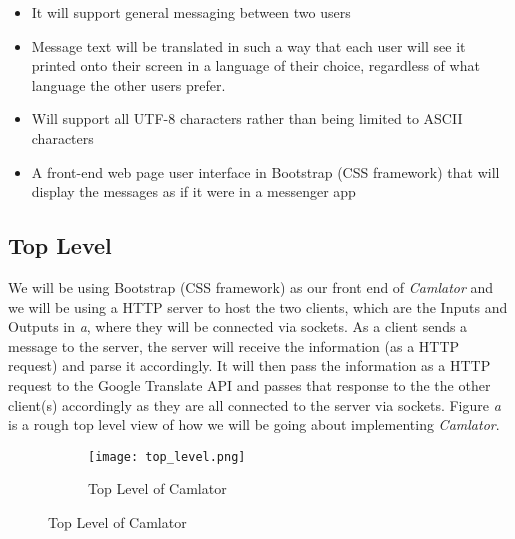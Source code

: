 \documentclass[12pt, letterpaper]{article}
\begin{document}
\begin{itemize}

\item It will support general messaging between two users 
\item Message text will be translated in such a way that each user will see it printed onto their screen in a language of their choice, regardless of what language the other users prefer. 
\item Will support all UTF-8 characters rather than being limited to ASCII characters
\item A front-end web page user interface in Bootstrap (CSS framework) that will display the messages as if it were in a messenger app 

\end{itemize} 

\subsection{Top Level}
We will be using Bootstrap (CSS framework) as our front end of \textit{Camlator} and we will be using a HTTP server to host the two clients, which are the Inputs and Outputs in \textit {a}, where they will be connected via sockets. As a client sends a message to the server, the server will receive the information (as a HTTP request) and parse it accordingly. It will then pass the information as a HTTP request to the Google Translate API and passes that response to the the other client(s) accordingly as they are all connected to the server via sockets. Figure \textit{a} is a rough top level view of how we will be going about implementing \textit{Camlator}. 

\begin{figure}[h!]
  	\centering
   	\begin{subfigure}[b]{1.1\linewidth}
    	\texttt{[image: top\_level.png]}
     	\caption{Top Level of Camlator}
   	\end{subfigure}
\end{figure}

\newpage
\end{document}
